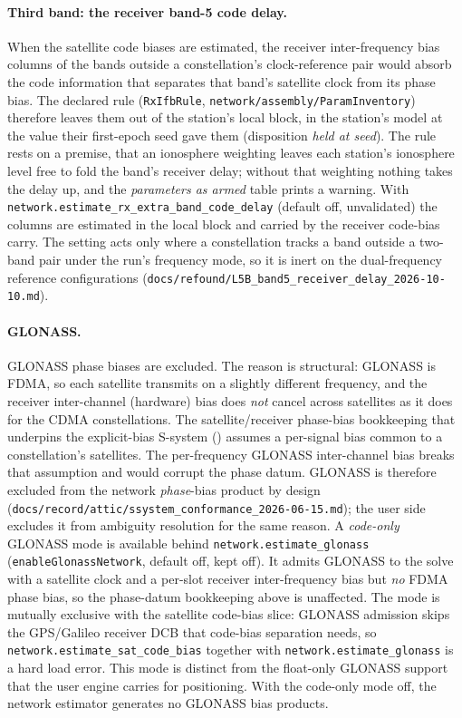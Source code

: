 \documentclass[main.tex]{subfiles}
\begin{document}
\paragraph{Third band: the receiver band-5 code delay.}
When the satellite code biases are estimated, the receiver
inter-frequency bias columns of the bands outside a constellation's
clock-reference pair would absorb the code information that separates
that band's satellite clock from its phase bias. The declared rule
(\texttt{RxIfbRule}, \texttt{network/assembly/ParamInventory}) therefore
leaves them out of the station's local block, in the station's model at
the value their first-epoch seed gave them (disposition \emph{held at
seed}). The rule rests on a premise, that an ionosphere weighting leaves
each station's ionosphere level free to fold the band's receiver delay;
without that weighting nothing takes the delay up, and the
\emph{parameters as armed} table prints a warning. With
\texttt{network.estimate\_rx\_extra\_band\_code\_delay} (default off,
unvalidated) the columns are estimated in the local block and carried by
the receiver code-bias carry. The setting acts only where a
constellation tracks a band outside a two-band pair under the run's
frequency mode, so it is inert on the dual-frequency reference
configurations
(\texttt{docs/refound/L5B\_band5\_receiver\_delay\_2026-10-10.md}).

\paragraph{GLONASS.}
GLONASS phase biases are excluded.
The reason is structural: GLONASS is FDMA, so each satellite transmits
on a slightly different frequency, and the receiver inter-channel
(hardware) bias does \emph{not} cancel across satellites as it does for
the CDMA constellations. The satellite/receiver phase-bias bookkeeping
that underpins the explicit-bias S-system
() assumes a per-signal bias
common to a constellation's satellites. The per-frequency GLONASS
inter-channel bias breaks that assumption and would corrupt the phase
datum. GLONASS is therefore excluded from the network \emph{phase}-bias
product by design (\texttt{docs/record/attic/ssystem\_conformance\_2026-06-15.md});
the user side excludes it from ambiguity resolution for the same reason.
A \emph{code-only} GLONASS mode is available behind
\texttt{network.estimate\_glonass} (\texttt{enableGlonassNetwork},
default off, kept off). It admits GLONASS to the solve with a satellite
clock and a per-slot receiver inter-frequency bias but \emph{no} FDMA
phase bias, so the phase-datum bookkeeping above is unaffected. The mode
is mutually exclusive with the satellite code-bias slice: GLONASS
admission skips the GPS/Galileo receiver DCB that code-bias separation
needs, so \texttt{network.estimate\_sat\_code\_bias} together with
\texttt{network.estimate\_glonass} is a hard load error. This mode is
distinct from the float-only GLONASS support that the user engine carries
for positioning. With the code-only mode off, the network estimator
generates no GLONASS bias products.
\end{document}
